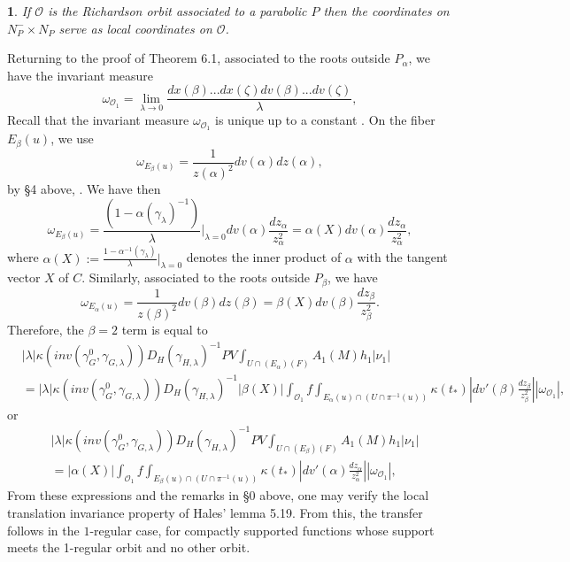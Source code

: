 \documentclass[12pt,letterpaper]{amsart}
\newcommand{\proclaimname}{}
\newtheorem*{proclaimx}{\proclaimname}
\newenvironment{proclaim}[1]%
  {\renewcommand{\proclaimname}{#1}\begin{proclaimx}}{\end{proclaimx}}
\begin{document}
\begin{proclaim}{Lemma 6.4 (Hales)}
If ${\mathcal O}$ is the Richardson orbit associated to a
parabolic $P$ then the coordinates on $N_P^- \times N_P$ serve as local
coordinates on ${\mathcal O}$.
\end{proclaim}

Returning to the proof of Theorem 6.1,
associated to the roots outside $P_\alpha$, we have the invariant measure
\[
\omega_{{\mathcal O}_1}=
\lim_{\lambda\rightarrow 0}
\frac{dx(\beta)...dx(\zeta)dv(\beta)...dv(\zeta)}{\lambda},
\]
Recall that the invariant measure $\omega_{{\mathcal O}_1}$ is
unique up to a constant \cite{Ra72}. On the fiber $E_\beta(u)$, we use
\[
\omega_{E_\beta(u)}=\frac{1}{z(\alpha)^2}dv(\alpha)dz(\alpha),
\]
by
\S 4 above, \cite[Lemma 2.12]{La83}. We have then
\[
\omega_{E_\beta(u)}=
\frac{(1-\alpha (\gamma_\lambda)^{-1})}{\lambda}\Big|_{\lambda=0}
dv(\alpha)\frac{dz_\alpha}{z_\alpha^2}
={\alpha(X)}dv(\alpha)\frac{dz_\alpha}{z_\alpha^2},
\]
where $\alpha(X):=\frac{1-\alpha^{-1}(\gamma_\lambda)}{\lambda}|_{\lambda=0}$
denotes the inner product of $\alpha$ with the tangent vector $X$ of $C$.
Similarly, associated to the roots outside $P_\beta$, we have
\[
\omega_{E_\alpha(u)}=\frac{1}{z(\beta)^2}dv(\beta)dz(\beta)
={\beta(X)}dv(\beta)\frac{dz_\beta}{z_\beta^2}.
\]
Therefore, the $\beta =2$ term is equal to
\[
\begin{split}
&|\lambda|\kappa(inv(\gamma_G^0,\gamma_{G,\lambda}))
D_H(\gamma_{H,\lambda})^{-1}
PV\int_{U\cap (E_\alpha)(F)}A_1(M)h_1|\nu_1|\\
&=
|\lambda|\kappa(inv(\gamma_G^0,\gamma_{G,\lambda}))
D_H(\gamma_{H,\lambda})^{-1}
|\beta(X)|\int_{{\mathcal O}_1}f\int_{E_\alpha(u)\cap (U\cap \pi^{-1}(u))}
\kappa(t_*)|dv'(\beta)
\frac{dz_\beta}{z_\beta^2}||\omega_{{\mathcal O}_1}|,
\end{split}
\tag{6.5a}
\]
or
\[
\begin{split}
&|\lambda|\kappa(inv(\gamma_G^0,\gamma_{G,\lambda}))
D_H(\gamma_{H,\lambda})^{-1}
PV\int_{U\cap (E_\beta)(F)}A_1(M)h_1|\nu_1|\\
&=|\alpha(X)|\int_{{\mathcal O}_1}f\int_{E_\beta(u)\cap (U\cap \pi^{-1}(u))}
\kappa(t_*)|dv'(\alpha)
\frac{dz_\alpha}{z_\alpha^2}||\omega_{{\mathcal O}_1}|,
\end{split}
\tag{6.5b}
\]
From these expressions and the remarks in \S 0 above,
one may verify the local translation invariance
property of Hales' lemma 5.19.
From this, the transfer follows in the $1$-regular case,
for compactly supported functions whose support meets the 1-regular
orbit and no other orbit.
\end{document}
